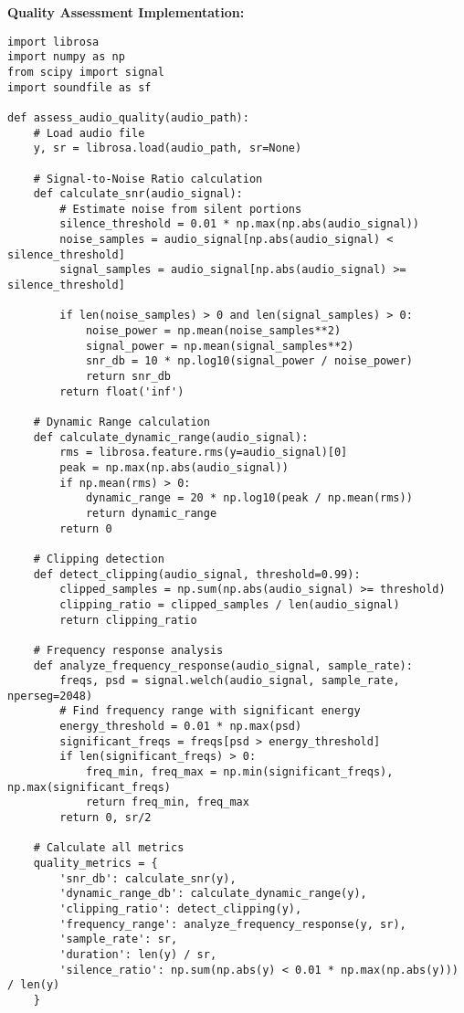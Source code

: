 \documentclass[12pt]{article}
\begin{document}
\textbf{Quality Assessment Implementation:}
\begin{verbatim}
import librosa
import numpy as np
from scipy import signal
import soundfile as sf

def assess_audio_quality(audio_path):
    # Load audio file
    y, sr = librosa.load(audio_path, sr=None)
    
    # Signal-to-Noise Ratio calculation
    def calculate_snr(audio_signal):
        # Estimate noise from silent portions
        silence_threshold = 0.01 * np.max(np.abs(audio_signal))
        noise_samples = audio_signal[np.abs(audio_signal) < silence_threshold]
        signal_samples = audio_signal[np.abs(audio_signal) >= silence_threshold]
        
        if len(noise_samples) > 0 and len(signal_samples) > 0:
            noise_power = np.mean(noise_samples**2)
            signal_power = np.mean(signal_samples**2)
            snr_db = 10 * np.log10(signal_power / noise_power)
            return snr_db
        return float('inf')
    
    # Dynamic Range calculation
    def calculate_dynamic_range(audio_signal):
        rms = librosa.feature.rms(y=audio_signal)[0]
        peak = np.max(np.abs(audio_signal))
        if np.mean(rms) > 0:
            dynamic_range = 20 * np.log10(peak / np.mean(rms))
            return dynamic_range
        return 0
    
    # Clipping detection
    def detect_clipping(audio_signal, threshold=0.99):
        clipped_samples = np.sum(np.abs(audio_signal) >= threshold)
        clipping_ratio = clipped_samples / len(audio_signal)
        return clipping_ratio
    
    # Frequency response analysis
    def analyze_frequency_response(audio_signal, sample_rate):
        freqs, psd = signal.welch(audio_signal, sample_rate, nperseg=2048)
        # Find frequency range with significant energy
        energy_threshold = 0.01 * np.max(psd)
        significant_freqs = freqs[psd > energy_threshold]
        if len(significant_freqs) > 0:
            freq_min, freq_max = np.min(significant_freqs), np.max(significant_freqs)
            return freq_min, freq_max
        return 0, sr/2
    
    # Calculate all metrics
    quality_metrics = {
        'snr_db': calculate_snr(y),
        'dynamic_range_db': calculate_dynamic_range(y),
        'clipping_ratio': detect_clipping(y),
        'frequency_range': analyze_frequency_response(y, sr),
        'sample_rate': sr,
        'duration': len(y) / sr,
        'silence_ratio': np.sum(np.abs(y) < 0.01 * np.max(np.abs(y))) / len(y)
    }
    

\end{verbatim}
\end{document}
